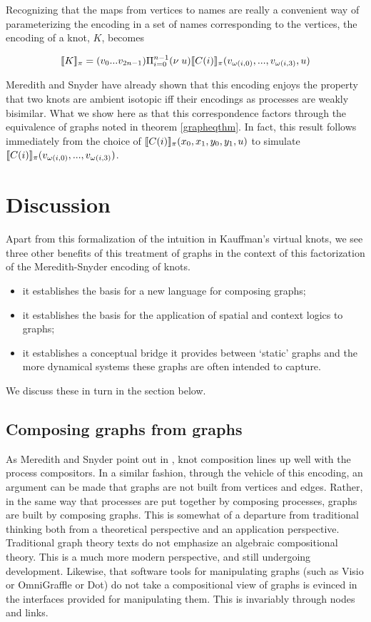 \documentclass[]{llncs}
\begin{document}
Recognizing that the maps from vertices to names are really a
convenient way of parameterizing the encoding in a set of names
corresponding to the vertices, the encoding of a knot, $K$, becomes

\begin{equation}
  [\![ K ]\!]_{\pi} = (v_0 ... v_{2n-1}) \Pi_{i = 0}^{n-1} (\nu \; u)[\![ C(i) ]\!]_{\pi}(v_{\omega(i,0)},...,v_{\omega(i,3)},u)
\end{equation}

Meredith and Snyder have already shown that this encoding enjoys the
property that two knots are ambient isotopic iff their encodings as
processes are weakly bisimilar. What we show here as that this
correspondence factors through the equivalence of graphs noted in
theorem \ref{grapheqthm}. In fact, this result follows immediately
from the choice of $[\![ C(i) ]\!]_{\pi}(x_0,x_1,y_0,y_1,u)$ to
simulate
$[\![ C(i) ]\!]_{\pi}(v_{\omega(i,0)},...,v_{\omega(i,3)})$.

\section{Discussion}

Apart from this formalization of the intuition in Kauffman's virtual
knots, we see three other benefits of this treatment of graphs in the
context of this factorization of the Meredith-Snyder encoding of
knots. 

\begin{itemize}
  \item it establishes the basis for a new language for composing graphs;
  \item it establishes the basis for the application of spatial and
    context logics to graphs;
  \item it establishes a conceptual bridge it provides between
    `static' graphs and the more dynamical systems these graphs are
    often intended to capture.
\end{itemize}

We discuss these in turn in the section below.

\subsection{Composing graphs from graphs}

As Meredith and Snyder point out in \cite{}, knot composition lines up
well with the process compositors. In a similar fashion, through the
vehicle of this encoding, an argument can be made that graphs are not
built from vertices and edges. Rather, in the same way that processes
are put together by composing processes, graphs are built by composing
graphs. This is somewhat of a departure from traditional thinking both
from a theoretical perspective and an application
perspective. Traditional graph theory texts do not emphasize an
algebraic compositional theory. This is a much more modern
perspective, and still undergoing development. Likewise, that software
tools for manipulating graphs (such as Visio or OmniGraffle or Dot) do
not take a compositional view of graphs is evinced in the interfaces
provided for manipulating them. This is invariably through nodes and
links.
\end{document}
